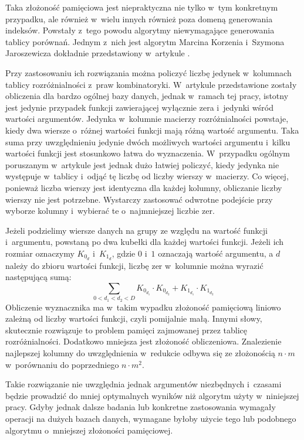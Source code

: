 Taka złożoność pamięciowa jest niepraktyczna nie tylko w~tym konkretnym przypadku,
ale również w~wielu innych również poza domeną generowania indeksów.
Powstały z~tego powodu algorytmy niewymagające generowania tablicy porównań.
Jednym z~nich jest algorytm Marcina Korzenia i~Szymona Jaroszewicza dokładnie przedstawiony w~artykule \cite{without-matrix}.

Przy zastosowaniu ich rozwiązania można policzyć liczbę jedynek w~kolumnach tablicy rozróżnialności z~praw kombinatoryki.
W~artykule przedstawione zostały obliczenia dla bardzo ogólnej bazy danych,
jednak w~ramach tej pracy,
istotny jest jedynie przypadek funkcji zawierającej wyłącznie zera i~jedynki wśród wartości argumentów.
Jedynka w~kolumnie macierzy rozróżnialności powstaje,
kiedy dwa wiersze o~różnej wartości funkcji mają różną wartość argumentu.
Taka suma przy uwzględnieniu jedynie dwóch możliwych wartości argumentu i~kilku wartości funkcji jest stosunkowo łatwa do wyznaczenia.
W~przypadku ogólnym poruszanym w~artykule jest jednak dużo łatwiej policzyć,
kiedy jedynka nie występuje w~tablicy i~odjąć tę liczbę od liczby wierszy w~macierzy.
Co więcej,
ponieważ liczba wierszy jest identyczna dla każdej kolumny,
obliczanie liczby wierszy nie jest potrzebne.
Wystarczy zastosować odwrotne podejście przy wyborze kolumny i~wybierać te o~najmniejszej liczbie zer.

Jeżeli podzielimy wiersze danych na grupy ze względu na wartość funkcji i~argumentu,
powstaną po dwa kubełki dla każdej wartości funkcji.
Jeżeli ich rozmiar oznaczymy $K_{0_d}$ i~$K_{1_d}$,
 gdzie $0$ i~$1$ oznaczają wartość argumentu,
a $d$ należy do zbioru wartości funkcji,
liczbę zer w~kolumnie można wyrazić następującą sumą:
\begin{equation}
\sum_{0<d_1<d_2<D} K_{0_{d_1}} \cdot K_{0_{d_2}} + K_{1_{d_1}} \cdot K_{1_{d_2}}
\end{equation}
Obliczenie wyznacznika ma w~takim wypadku złożoność pamięciową liniowo zależną od liczby wartości funkcji,
czyli pomijalnie małą.
Innymi słowy, skutecznie rozwiązuje to problem pamięci zajmowanej przez tablicę rozróżnialności.
Dodatkowo mniejsza jest złożoność obliczeniowa.
Znalezienie najlepszej kolumny do uwzględnienia w~redukcie odbywa się ze złożonością $n \cdot m$ w~porównaniu do poprzedniego $n \cdot m^2$.

Takie rozwiązanie nie uwzględnia jednak argumentów niezbędnych i~czasami będzie prowadzić do mniej optymalnych wyników niż algorytm użyty w~niniejszej pracy.
Gdyby jednak dalsze badania lub konkretne zastosowania wymagały operacji na dużych bazach danych,
wymagane byłoby użycie tego lub podobnego algorytmu o~mniejszej złożoności pamięciowej.

